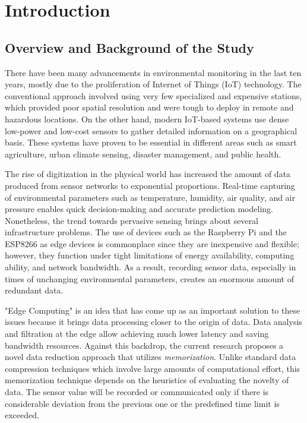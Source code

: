 \chapter{Introduction}
\label{ch:introduction}

\section{Overview and Background of the Study}
There have been many advancements in environmental monitoring in the last ten years, mostly due to the proliferation of Internet of Things (IoT) technology. The conventional approach involved using very few specialized and expensive stations, which provided poor spatial resolution and were tough to deploy in remote and hazardous locations. On the other hand, modern IoT-based systems use dense low-power and low-cost sensors to gather detailed information on a geographical basis. These systems have proven to be essential in different areas such as smart agriculture, urban climate sensing, disaster management, and public health.

The rise of digitization in the physical world has increased the amount of data produced from sensor networks to exponential proportions. Real-time capturing of environmental parameters such as temperature, humidity, air quality, and air pressure enables quick decision-making and accurate prediction modeling. Nonetheless, the trend towards pervasive sensing brings about several infrastructure problems. The use of devices such as the Raspberry Pi and the ESP8266 as edge devices is commonplace since they are inexpensive and flexible; however, they function under tight limitations of energy availability, computing ability, and network bandwidth. As a result, recording sensor data, especially in times of unchanging environmental parameters, creates an enormous amount of redundant data.

"Edge Computing" is an idea that has come up as an important solution to these issues because it brings data processing closer to the origin of data. Data analysis and filtration at the edge allow achieving much lower latency and saving bandwidth resources. Against this backdrop, the current research proposes a novel data reduction approach that utilizes \textit{memorization}. Unlike standard data compression techniques which involve large amounts of computational effort, this memorization technique depends on the heuristics of evaluating the novelty of data. The sensor value will be recorded or communicated only if there is considerable deviation from the previous one or the predefined time limit is exceeded.


